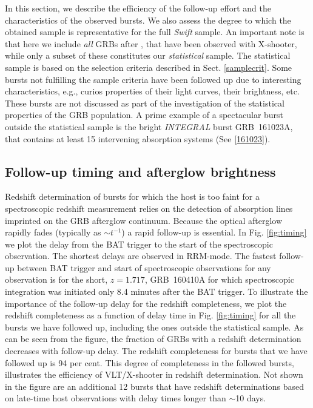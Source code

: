 \documentclass{aa}    %
\begin{document}
In this section, we describe the efficiency of the follow-up effort and the
characteristics of the observed bursts. We also assess the degree to which the
obtained sample is representative for the full \textit{Swift} sample. An
important note is that here we include \textit{all} GRBs after \startdate, that
have been observed with X-shooter, while only a subset of these constitutes our
\textit{statistical} sample. The statistical sample is based on the selection
criteria described in Sect. \ref{samplecrit}. Some bursts not fulfilling the
sample criteria have been followed up due to interesting characteristics, e.g.,
curios properties of their light curves, their brightness, etc. These bursts
are not discussed as part of the investigation of the statistical properties of
the GRB population. A prime example of a spectacular burst outside the
statistical sample is the bright \textit{INTEGRAL} burst GRB~161023A, that
contains at least 15 intervening absorption systems (See \ref{161023}).


\subsection{Follow-up timing and afterglow brightness} \label{timing}

Redshift determination of bursts for which the host is too faint for a
spectroscopic redshift measurement relies on the detection of absorption lines
imprinted on the GRB afterglow continuum. Because the optical afterglow rapidly
fades (typically as $\sim t^{-1}$) a rapid follow-up is essential. In Fig.
\ref{fig:timing} we plot the delay from the BAT trigger to the start of the
spectroscopic observation. The shortest delays are observed in RRM-mode. The
fastest follow-up between BAT trigger and start of spectroscopic observations
for any observation is for the short, $z = 1.717$, GRB~160410A for which
spectroscopic integration was initiated only 8.4 minutes after the BAT trigger.
To illustrate the importance of the follow-up delay for the redshift
completeness, we plot the redshift completeness as a function of delay time in
Fig. \ref{fig:timing} for all the bursts we have followed up, including the ones
outside the statistical sample. As can be seen from the figure, the fraction of
GRBs with a redshift determination decreases with follow-up delay. The redshift
completeness for bursts that we have followed up is 94 per cent. This degree of
completeness in the followed bursts, illustrates the efficiency of VLT/X-shooter
in redshift determination. Not shown in the figure are an additional 12 bursts
that have redshift determinations based on late-time host observations with
delay times longer than $\sim$10 days.
\end{document}
